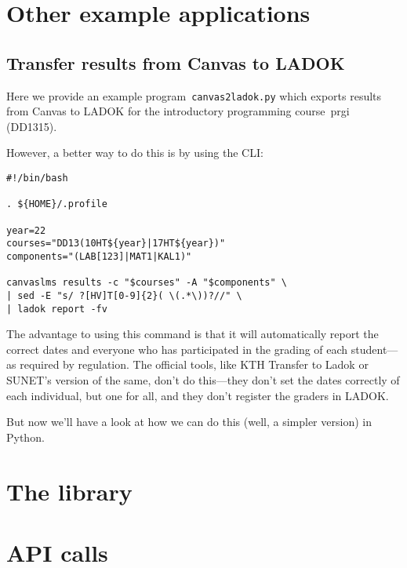 \documentclass[a4paper,oneside]{memoir}
\begin{document}




\part{Other example applications}

\chapter{Transfer results from Canvas to LADOK}

Here we provide an example program~\texttt{canvas2ladok.py} which exports 
results from Canvas to LADOK for the introductory programming course~prgi 
(DD1315).

However, a better way to do this is by using the CLI:
\begin{verbatim}
#!/bin/bash

. ${HOME}/.profile

year=22
courses="DD13(10HT${year}|17HT${year})"
components="(LAB[123]|MAT1|KAL1)"

canvaslms results -c "$courses" -A "$components" \
| sed -E "s/ ?[HV]T[0-9]{2}( \(.*\))?//" \
| ladok report -fv
\end{verbatim}
The advantage to using this command is that it will automatically report the 
correct dates and everyone who has participated in the grading of each 
student---as required by regulation.
The official tools, like KTH Transfer to Ladok or SUNET's version of the same, 
don't do this---they don't set the dates correctly of each individual, but one 
for all, and they don't register the graders in LADOK.

But now we'll have a look at how we can do this (well, a simpler version) in 
Python.





\part{The library}




\part{API calls}






\backmatter
\printbibliography
\end{document}

